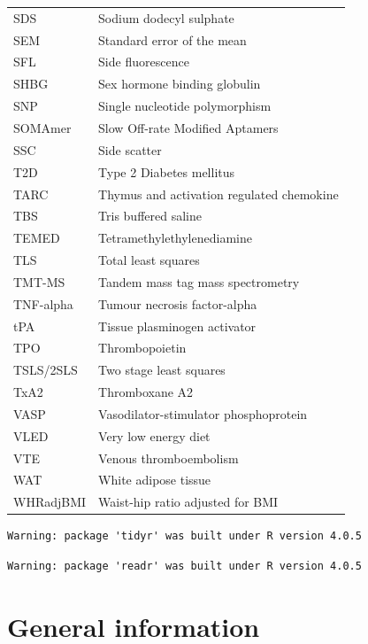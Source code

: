 \documentclass[11pt,twoside]{bristolthesis}
\newcommand\blankpage{%
    \null
    \thispagestyle{empty}%
    \addtocounter{page}{-1}%
    \newpage}
\begin{document}
\begin{abbreviations}
\begin{longtable}[t]{ll}
    SDS & Sodium dodecyl sulphate\\
    SEM & Standard error of the mean\\
    SFL & Side fluorescence\\
    SHBG & Sex hormone binding globulin\\
    \addlinespace
    SNP & Single nucleotide polymorphism\\
    SOMAmer & Slow Off-rate Modified Aptamers\\
    SSC & Side scatter\\
    T2D & Type 2 Diabetes mellitus\\
    TARC & Thymus and activation regulated chemokine\\
    \addlinespace
    TBS & Tris buffered saline\\
    TEMED & Tetramethylethylenediamine\\
    TLS & Total least squares\\
    TMT-MS & Tandem mass tag mass spectrometry\\
    TNF-alpha & Tumour necrosis factor-alpha\\
    \addlinespace
    tPA & Tissue plasminogen activator\\
    TPO & Thrombopoietin\\
    TSLS/2SLS & Two stage least squares\\
    TxA2 & Thromboxane A2\\
    VASP & Vasodilator-stimulator phosphoprotein\\
    VLED & Very low energy diet\\
    \addlinespace
    VTE & Venous thromboembolism\\
    WAT & White adipose tissue\\
    WHRadjBMI & Waist-hip ratio adjusted for BMI\\
    \bottomrule
    \end{longtable}
    \afterpage{\blankpage}
  \end{abbreviations}
\endgroup


\mainmatter %
\pagestyle{plain}
\begin{verbatim}
Warning: package 'tidyr' was built under R version 4.0.5
\end{verbatim}
\begin{verbatim}
Warning: package 'readr' was built under R version 4.0.5
\end{verbatim}
\hypertarget{general-information}{%
\chapter{General information}\label{general-information}}
\end{document}
